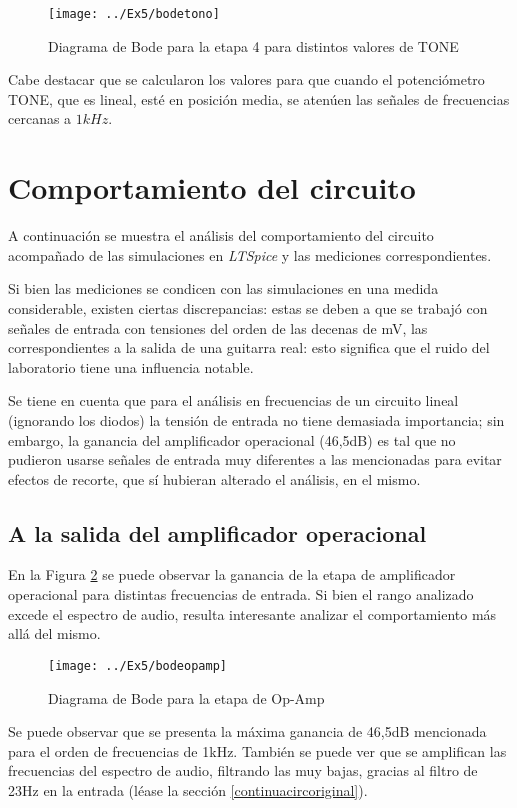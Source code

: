 \begin{figure}[h]
    \centering
    \texttt{[image: ../Ex5/bodetono]}
    \caption{Diagrama de Bode para la etapa 4 para distintos valores de TONE}
    \label{fig:bodetono}
\end{figure}

Cabe destacar que se calcularon los valores para que cuando el potenciómetro TONE, que es lineal, esté en posición media, se atenúen las señales de frecuencias cercanas a $1kHz$.

\section{Comportamiento del circuito}
A continuación se muestra el análisis del comportamiento del circuito acompañado de las simulaciones en \emph{LTSpice} y las mediciones correspondientes.

Si bien las mediciones se condicen con las simulaciones en una medida considerable, existen ciertas discrepancias: estas se deben a que se trabajó con señales de entrada con tensiones del orden de las decenas de mV, las correspondientes a la salida de una guitarra real: esto significa que el ruido del laboratorio tiene una influencia notable.

Se tiene en cuenta que para el análisis en frecuencias de un circuito lineal (ignorando los diodos) la tensión de entrada no tiene demasiada importancia; sin embargo, la ganancia del amplificador operacional (46,5dB) es tal que no pudieron usarse señales de entrada muy diferentes a las mencionadas para evitar efectos de recorte, que sí hubieran alterado el análisis, en el mismo.

\subsection{A la salida del amplificador operacional}
En la Figura \ref{fig:bodeopamp} se puede observar la ganancia de la etapa de amplificador operacional para distintas frecuencias de entrada. Si bien el rango analizado excede el espectro de audio, resulta interesante analizar el comportamiento más allá del mismo.

\begin{figure}[h]
    \centering
    \texttt{[image: ../Ex5/bodeopamp]}
    \caption{Diagrama de Bode para la etapa de Op-Amp}
    \label{fig:bodeopamp}
\end{figure}

Se puede observar que se presenta la máxima ganancia de 46,5dB mencionada para el orden de frecuencias de 1kHz. También se puede ver que se amplifican las frecuencias del espectro de audio, filtrando las muy bajas, gracias al filtro de 23Hz en la entrada (léase la sección \ref{continuacircoriginal}).

